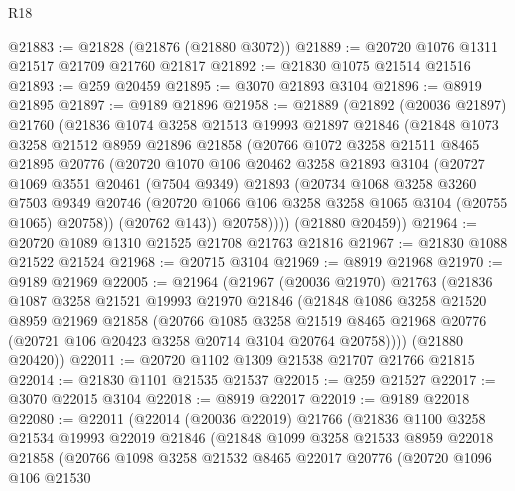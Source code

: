\begin{lexlean}{R18}
\begin{coremodule}
@21883 := @21828 (@21876 (@21880 @3072))
@21889 := @20720 @1076 @1311 @21517 @21709 @21760 @21817
@21892 := @21830 @1075 @21514 @21516
@21893 := @259 @20459
@21895 := @3070 @21893 @3104
@21896 := @8919 @21895
@21897 := @9189 @21896
@21958 := @21889
    (@21892
      (@20036 @21897)
      @21760
      (@21836
        @1074
        @3258
        @21513
        @19993
        @21897
        @21846
        (@21848
          @1073
          @3258
          @21512
          @8959
          @21896
          @21858
          (@20766
            @1072
            @3258
            @21511
            @8465
            @21895
            @20776
            (@20720
              @1070
              @106
              @20462
              @3258
              @21893
              @3104
              (@20727
                @1069
                @3551
                @20461
                (@7504 @9349)
                @21893
                (@20734
                  @1068
                  @3258
                  @3260
                  @7503
                  @9349
                  @20746
                  (@20720 @1066 @106 @3258 @3258 @1065 @3104 (@20755 @1065) @20758))
                (@20762 @143))
              @20758))))
      (@21880 @20459))
@21964 := @20720 @1089 @1310 @21525 @21708 @21763 @21816
@21967 := @21830 @1088 @21522 @21524
@21968 := @20715 @3104
@21969 := @8919 @21968
@21970 := @9189 @21969
@22005 := @21964
    (@21967
      (@20036 @21970)
      @21763
      (@21836
        @1087
        @3258
        @21521
        @19993
        @21970
        @21846
        (@21848
          @1086
          @3258
          @21520
          @8959
          @21969
          @21858
          (@20766
            @1085
            @3258
            @21519
            @8465
            @21968
            @20776
            (@20721 @106 @20423 @3258 @20714 @3104 @20764 @20758))))
      (@21880 @20420))
@22011 := @20720 @1102 @1309 @21538 @21707 @21766 @21815
@22014 := @21830 @1101 @21535 @21537
@22015 := @259 @21527
@22017 := @3070 @22015 @3104
@22018 := @8919 @22017
@22019 := @9189 @22018
@22080 := @22011
    (@22014
      (@20036 @22019)
      @21766
      (@21836
        @1100
        @3258
        @21534
        @19993
        @22019
        @21846
        (@21848
          @1099
          @3258
          @21533
          @8959
          @22018
          @21858
          (@20766
            @1098
            @3258
            @21532
            @8465
            @22017
            @20776
            (@20720
              @1096
              @106
              @21530

\end{coremodule}
\end{lexlean}

